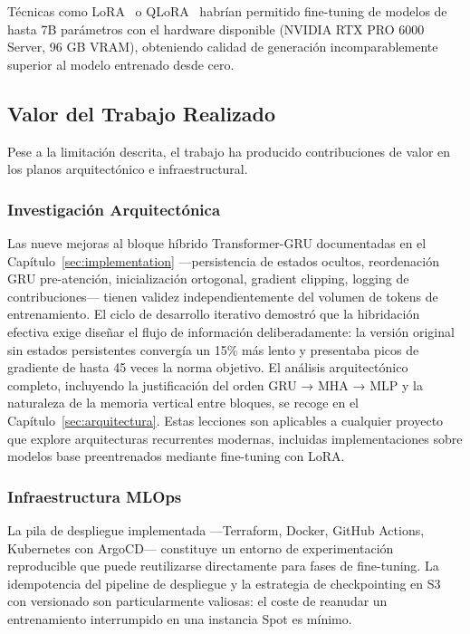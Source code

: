 Técnicas como LoRA~\cite{hu2021lora} o QLoRA~\cite{dettmers2023qlora} habrían permitido fine-tuning de modelos de hasta 7B parámetros con el hardware disponible (NVIDIA RTX PRO 6000 Server, 96 GB VRAM), obteniendo calidad de generación incomparablemente superior al modelo entrenado desde cero.

\subsection{Valor del Trabajo Realizado}

Pese a la limitación descrita, el trabajo ha producido contribuciones de valor en los planos arquitectónico e infraestructural.

\subsubsection{Investigación Arquitectónica}

Las nueve mejoras al bloque híbrido Transformer-GRU documentadas en el Capítulo~\ref{sec:implementation} ---persistencia de estados ocultos, reordenación GRU pre-atención, inicialización ortogonal, gradient clipping, logging de contribuciones--- tienen validez independientemente del volumen de tokens de entrenamiento. El ciclo de desarrollo iterativo demostró que la hibridación efectiva exige diseñar el flujo de información deliberadamente: la versión original sin estados persistentes convergía un 15\% más lento y presentaba picos de gradiente de hasta 45 veces la norma objetivo. El análisis arquitectónico completo, incluyendo la justificación del orden GRU → MHA → MLP y la naturaleza de la memoria vertical entre bloques, se recoge en el Capítulo~\ref{sec:arquitectura}. Estas lecciones son aplicables a cualquier proyecto que explore arquitecturas recurrentes modernas, incluidas implementaciones sobre modelos base preentrenados mediante fine-tuning con LoRA.

\subsubsection{Infraestructura MLOps}

La pila de despliegue implementada ---Terraform, Docker, GitHub Actions, Kubernetes con ArgoCD--- constituye un entorno de experimentación reproducible que puede reutilizarse directamente para fases de fine-tuning. La idempotencia del pipeline de despliegue y la estrategia de checkpointing en S3 con versionado son particularmente valiosas: el coste de reanudar un entrenamiento interrumpido en una instancia Spot es mínimo.

